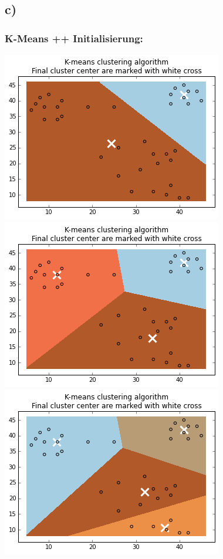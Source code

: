 \documentclass[a4paper,parskip=full-]{article}
\begin{document}
\subsection{c)}

\subsubsection{ K-Means ++ Initialisierung: }
\begin{minipage}{\textwidth}

\includegraphics[scale=0.4]{spaeth_01_2clu.png}
\includegraphics[scale=0.4]{spaeth_01_3clu.png}
\includegraphics[scale=0.4]{spaeth_01_4clu.png}
\end{minipage}
\newline
\end{document}
